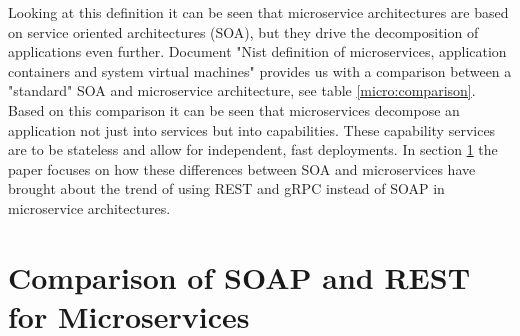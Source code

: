 \documentclass[conference]{IEEEtran}
\begin{document}
Looking at this definition it can be seen that microservice architectures are based on service oriented architectures (SOA), but they drive the decomposition of applications even further. Document "Nist definition of microservices, application containers and system virtual machines" \cite{karmel2016nist} provides us with a comparison between a "standard" SOA and microservice architecture, see table \ref{micro:comparison}. Based on this comparison it can be seen that microservices decompose an application not just into services but into capabilities. These capability services are to be stateless and allow for independent, fast deployments. In section \ref{sec:comp} the paper focuses on how these differences between SOA and microservices have brought about the trend of using REST and gRPC instead of SOAP in microservice architectures.

\section{Comparison of SOAP and REST for Microservices}
\label{sec:comp}
\end{document}
